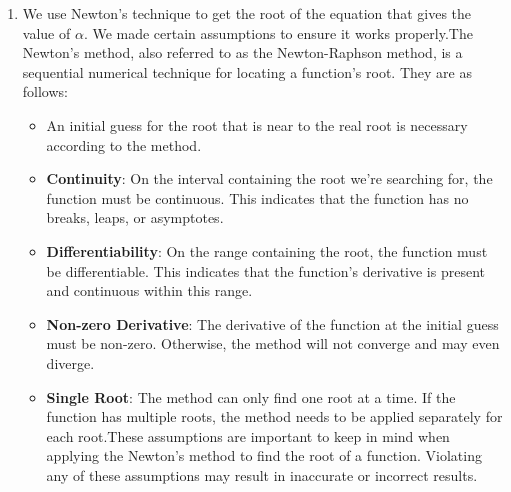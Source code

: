\begin{enumerate}
\item We use Newton's technique to get the root of the equation that gives the value of $\alpha$. We made certain assumptions to ensure it works properly.The Newton's method, also referred to as the Newton-Raphson method, is a sequential numerical technique for locating a function's root. 
They are as follows:
\begin{itemize}
    \item An initial guess for the root that is near to the real root is necessary according to the method.
    \item \textbf{Continuity}: On the interval containing the root we're searching for, the function must be continuous. This indicates that the function has no breaks, leaps, or asymptotes.
    \item \textbf{Differentiability}: On the range containing the root, the function must be differentiable. This indicates that the function's derivative is present and continuous within this range.
    \item \textbf{Non-zero Derivative}: The derivative of the function at the initial guess must be non-zero. Otherwise, the method will not converge and may even diverge.
    \item \textbf{Single Root}: The method can only find one root at a time. If the function has multiple roots, the method needs to be applied separately for each root.These assumptions are important to keep in mind when applying the Newton's method to find the root of a function. Violating any of these assumptions may result in inaccurate or incorrect results.
\end{itemize} 
\end{enumerate}





